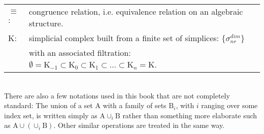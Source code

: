 \begin{table}[htpb]
\begin{tabular}{ l l }
	$\equiv$: & congruence relation, i.e. equivalence relation on an algebraic structure.\\
	$\mathrm{K}$: & simplicial complex built from a finite set of simplices: $\{ \sigma^{dim}_{nr} \}$\\ & with an associated filtration: $ \emptyset = \mathrm{K}_{-1} \subset \mathrm{K}_{0} \subset \mathrm{K}_{1} \subset \dots \subset \mathrm{K}_{n} = \mathrm{K}$.\\
\end{tabular}
\end{table}\\
There are also a few notations used in this book that are not completely standard:
The union of a set $\mathrm{A}$ with a family of sets $\mathrm{B}_{i}$, with $i$ ranging over some index set, is written simply as $\mathrm{A} \cup_{i} \mathrm{B}$ rather than something more elaborate such as $\mathrm{A} \cup (\cup_{i} \mathrm{B})$. Other similar operations are treated in the same way.
